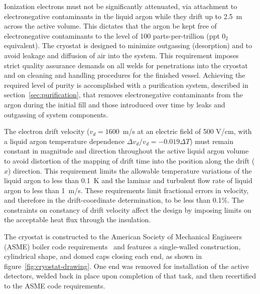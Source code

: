 Ionization electrons must not be significantly attenuated, via attachment to electronegative contaminants in the liquid argon while they drift up to 2.5~m across the active volume. This dictates that the argon be kept free of electronegative contaminants to the level of 100 parts-per-trillion (ppt 0$_2$ equivalent). The cryostat is designed to minimize outgassing (desorption) and to avoid leakage and diffusion of air into the system. This requirement imposes strict quality assurance demands on all welds for penetrations into the cryostat and on cleaning and handling procedures for the finished vessel.  Achieving the required level of purity is accomplished with a purification system, described in section~\ref{sec:purification}, that removes electronegative contaminants from the argon during the initial fill and those introduced over time by leaks and outgassing of system components.

The electron drift velocity ($v_{d} = 1600$~m/s at an electric field of 500 V/cm, with a liquid argon temperature dependence $\Delta v_{d}/v_{d} = -0.019\Delta T$) must remain constant in magnitude and direction throughout the active liquid argon volume to avoid distortion of the mapping of drift time into the position along the drift ($\hat{x}$) direction. This requirement limits the allowable temperature variations of the liquid argon to less than 0.1~K and the laminar and turbulent flow rate of liquid argon to less than 1~m/s. These requirements limit fractional errors in velocity, and therefore in the drift-coordinate determination, to be less than 0.1\%. The constraints on constancy of drift velocity affect the design by imposing limits on the acceptable heat flux through the insulation.

The cryostat is constructed to the American Society of Mechanical Engineers (ASME) boiler code requirements~\cite{pressure:1316452} and features a single-walled construction, cylindrical shape, and domed caps closing each end, as shown in figure~\ref{fig:cryostat-drawing}. One end was removed for installation of the active detectors, welded back in place upon completion of that task, and then recertified to the ASME code requirements.  


